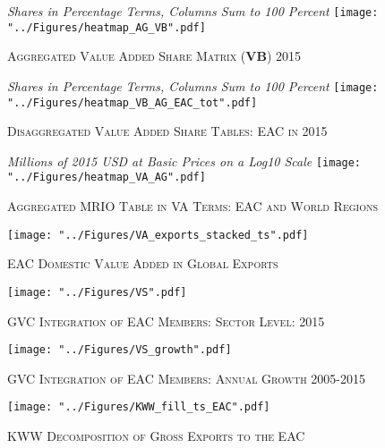 \documentclass[a4paper]{article}
\begin{document}
\begin{figure}[h!]
\centering
\caption{\label{fig:wldVB}\textsc{Aggregated Value Added Share Matrix (\textbf{VB}) 2015}}
\small{\textit{Shares in Percentage Terms, Columns Sum to 100 Percent}}
\texttt{[image: "../Figures/heatmap\_AG\_VB".pdf]} %
\end{figure}
\FloatBarrier

\begin{figure}[h!]
\centering
\caption{\label{fig:eacVB}\textsc{Disaggregated Value Added Share Tables: EAC in 2015}}
\small{\textit{Shares in Percentage Terms, Columns Sum to 100 Percent}}
\texttt{[image: "../Figures/heatmap\_VB\_AG\_EAC\_tot".pdf]} %
\end{figure}
\FloatBarrier

\begin{figure}[h!]
\centering
\caption{\label{fig:VAwld}\textsc{Aggregated MRIO Table in VA Terms: EAC and World Regions}}
\small{\textit{Millions of 2015 USD at Basic Prices on a Log10 Scale}}
\texttt{[image: "../Figures/heatmap\_VA\_AG".pdf]} %
\end{figure}
\FloatBarrier

\begin{figure}[h!]
\centering
\caption{\label{fig:VAexp}\textsc{EAC Domestic Value Added in Global Exports}}
\texttt{[image: "../Figures/VA\_exports\_stacked\_ts".pdf]} %
\end{figure}
\FloatBarrier

\begin{figure}[h!]
\centering
\caption{\label{fig:VS}\textsc{GVC Integration of EAC Members: Sector Level: 2015}}
\texttt{[image: "../Figures/VS".pdf]} %
\end{figure}
\FloatBarrier

\begin{figure}[h!]
\centering
\caption{\label{fig:VSgr}\textsc{GVC Integration of EAC Members: Annual Growth 2005-2015}}
\texttt{[image: "../Figures/VS\_growth".pdf]} %
\end{figure}
\FloatBarrier


\begin{figure}[h!] \vspace{-1cm}
\centering
\caption{\label{fig:KWW_fill_ts_EAC}\textsc{KWW Decomposition of Gross Exports to the EAC}}
\texttt{[image: "../Figures/KWW\_fill\_ts\_EAC".pdf]} %
\vspace{-0.8cm}
\end{figure}
\FloatBarrier
\end{document}
